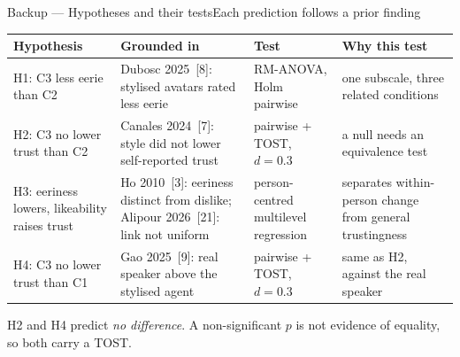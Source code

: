 \documentclass[aspectratio=169,10pt]{beamer}
\begin{document}
\begin{frame}{Backup — Hypotheses and their tests}{Each prediction follows a prior finding}
  \vspace{0.1em}
  {\tiny
  \setlength{\tabcolsep}{4pt}\renewcommand{\arraystretch}{1.45}
  \begin{tabular}{@{}>{\raggedright\arraybackslash}m{}>{\raggedright\arraybackslash}m{}>{\raggedright\arraybackslash}m{}>{\raggedright\arraybackslash}m{}@{}}
    \toprule
    \textbf{Hypothesis} & \textbf{Grounded in} & \textbf{Test} & \textbf{Why this test} \\
    \midrule
    H1: C3 less eerie than C2 & Dubosc 2025~[8]: stylised avatars rated less eerie & RM-ANOVA, Holm pairwise & one subscale, three related conditions \\
    H2: C3 no lower trust than C2 & Canales 2024~[7]: style did not lower self-reported trust & pairwise + TOST, $d=0.3$ & a null needs an equivalence test \\
    H3: eeriness lowers, likeability raises trust & Ho 2010~[3]: eeriness distinct from dislike; Alipour 2026~[21]: link not uniform & person-centred multilevel regression & separates within-person change from general trustingness \\
    H4: C3 no lower trust than C1 & Gao 2025~[9]: real speaker above the stylised agent & pairwise + TOST, $d=0.3$ & same as H2, against the real speaker \\
    \bottomrule
  \end{tabular}\par}
  \vspace{0.5em}
  {\scriptsize\color{knblue}H2 and H4 predict \emph{no difference}. A non-significant $p$ is not evidence of equality, so both carry a TOST.\par}
\end{frame}
\end{document}

